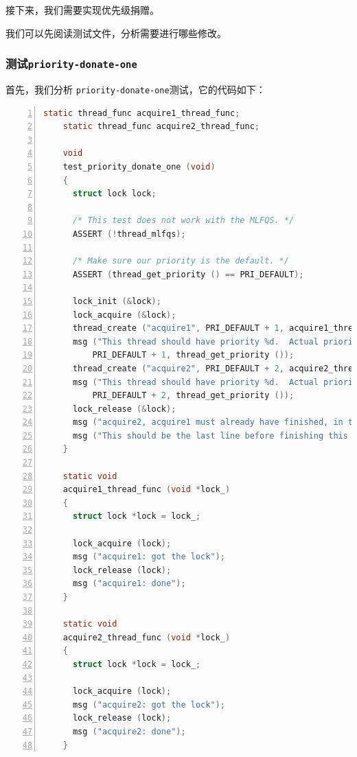 \documentclass{article}
\begin{document}
接下来，我们需要实现优先级捐赠。

我们可以先阅读测试文件，分析需要进行哪些修改。

\subsubsection{测试\texttt{priority-donate-one}}

首先，我们分析 \texttt{priority-donate-one}测试，它的代码如下：

\begin{lstlisting}[xleftmargin = 4em,xrightmargin = 3em, aboveskip = 1em, numbers = left, language = C, title=\texttt{priority-donate-one}测试]
    static thread_func acquire1_thread_func;
    static thread_func acquire2_thread_func;

    void
    test_priority_donate_one (void) 
    {
      struct lock lock;

      /* This test does not work with the MLFQS. */
      ASSERT (!thread_mlfqs);

      /* Make sure our priority is the default. */
      ASSERT (thread_get_priority () == PRI_DEFAULT);

      lock_init (&lock);
      lock_acquire (&lock);
      thread_create ("acquire1", PRI_DEFAULT + 1, acquire1_thread_func, &lock);
      msg ("This thread should have priority %d.  Actual priority: %d.",
          PRI_DEFAULT + 1, thread_get_priority ());
      thread_create ("acquire2", PRI_DEFAULT + 2, acquire2_thread_func, &lock);
      msg ("This thread should have priority %d.  Actual priority: %d.",
          PRI_DEFAULT + 2, thread_get_priority ());
      lock_release (&lock);
      msg ("acquire2, acquire1 must already have finished, in that order.");
      msg ("This should be the last line before finishing this test.");
    }

    static void
    acquire1_thread_func (void *lock_) 
    {
      struct lock *lock = lock_;

      lock_acquire (lock);
      msg ("acquire1: got the lock");
      lock_release (lock);
      msg ("acquire1: done");
    }

    static void
    acquire2_thread_func (void *lock_) 
    {
      struct lock *lock = lock_;

      lock_acquire (lock);
      msg ("acquire2: got the lock");
      lock_release (lock);
      msg ("acquire2: done");
    }

\end{lstlisting}
\end{document}
